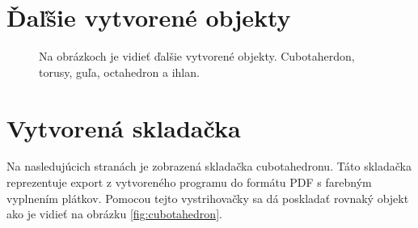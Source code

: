 \chapter{Ďaľšie vytvorené objekty}

\begin{figure}[!h]
\centering
{}\quad
{}\quad
{}\quad
{}\quad
{}\quad
{}
\caption{Na obrázkoch je vidieť ďalšie vytvorené objekty. Cubotaherdon, torusy, guľa, octahedron a ihlan.}
\label{fig:dalsie}
\end{figure}


\chapter{Vytvorená skladačka}
Na nasledujúcich stranách je zobrazená skladačka cubotahedronu. Táto skladačka reprezentuje export z vytvoreného programu do formátu PDF s farebným vyplnením plátkov. Pomocou tejto vystrihovačky sa dá poskladať rovnaký objekt ako je vidieť na obrázku \ref{fig:cubotahedron}.




